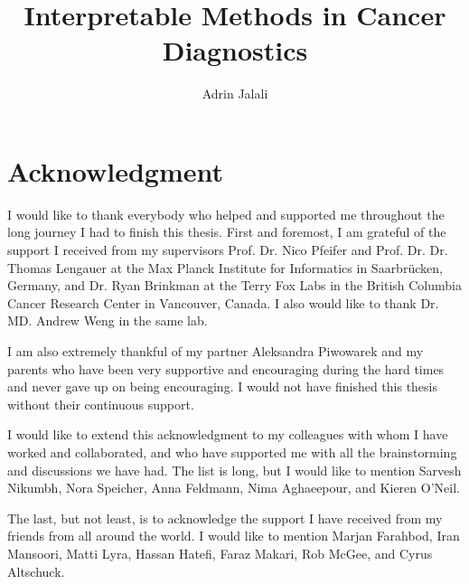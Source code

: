 \documentclass{thesis}
\title{Interpretable Methods in Cancer Diagnostics}
\author{Adrin Jalali}
\begin{document}
\frontmatter

\maketitle
\tableofcontents


\chapter{Acknowledgment}
I would like to thank everybody who helped and supported me throughout the long
journey I had to finish this thesis. First and foremost, I am grateful of the
support I received from my supervisors Prof. Dr. Nico Pfeifer and Prof. Dr. Dr.
Thomas Lengauer at the Max Planck Institute for Informatics in Saarbr\"ucken,
Germany, and Dr. Ryan Brinkman at the Terry Fox Labs in the British Columbia
Cancer Research Center in Vancouver, Canada. I also would like to thank Dr. MD.
Andrew Weng in the same lab.

I am also extremely thankful of my partner Aleksandra Piwowarek and my parents
who have been very supportive and encouraging during the hard times and never
gave up on being encouraging. I would not have finished this thesis without
their continuous support.

I would like to extend this acknowledgment to my colleagues with whom I have
worked and collaborated, and who have supported me with all the brainstorming
and discussions we have had. The list is long, but I would like to mention
Sarvesh Nikumbh, Nora Speicher, Anna Feldmann, Nima Aghaeepour, and Kieren
O'Neil.

The last, but not least, is to acknowledge the support I have received from my
friends from all around the world. I would like to mention Marjan Farahbod,
Iran Mansoori, Matti Lyra, Hassan Hatefi, Faraz Makari, Rob McGee, and Cyrus
Altschuck.


\mainmatter
\end{document}
